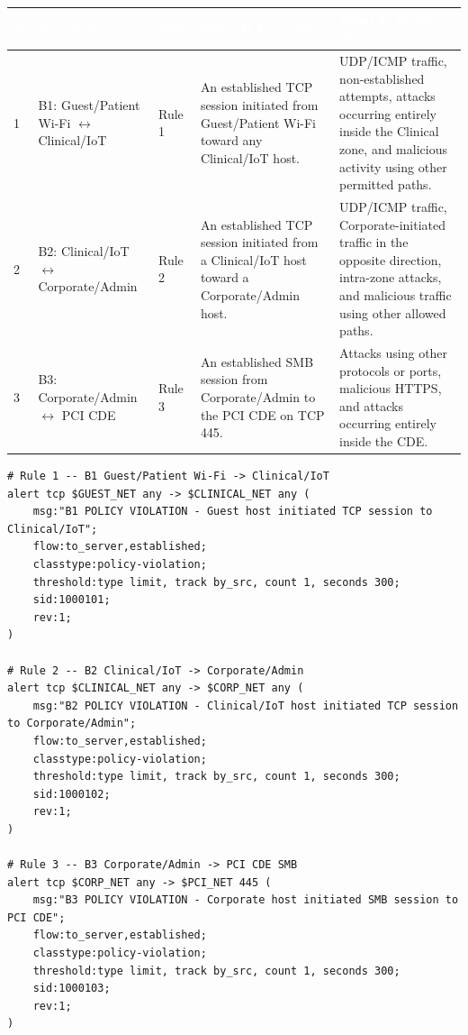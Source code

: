 \documentclass[11pt,letterpaper]{article}
\renewcommand{\arraystretch}{1.22}
\newcommand{\labtablesetup}{%
  \footnotesize
  \setlength{\tabcolsep}{4pt}%
  \renewcommand{\arraystretch}{1.28}%
}
\begin{document}
\begingroup\labtablesetup
{}
\begin{tabularx}{\textwidth}{@{}L{0.5cm}L{2.8cm}L{1.4cm}Y Y@{}}
\toprule
{}
\textcolor{white}{\textbf{\#}} &
\textcolor{white}{\textbf{Boundary}} &
\textcolor{white}{\textbf{Rule}} &
\textcolor{white}{\textbf{What It Fires On}} &
\textcolor{white}{\textbf{What It Would Miss}} \\
 &
B1: Guest/Patient Wi-Fi $\leftrightarrow$ Clinical/IoT &
Rule 1 &
An established TCP session initiated from Guest/Patient Wi-Fi toward any Clinical/IoT host. &
UDP/ICMP traffic, non-established attempts, attacks occurring entirely inside the Clinical zone, and malicious activity using other permitted paths. \\
2 &
B2: Clinical/IoT $\leftrightarrow$ Corporate/Admin &
Rule 2 &
An established TCP session initiated from a Clinical/IoT host toward a Corporate/Admin host. &
UDP/ICMP traffic, Corporate-initiated traffic in the opposite direction, intra-zone attacks, and malicious traffic using other allowed paths. \\
3 &
B3: Corporate/Admin $\leftrightarrow$ PCI CDE &
Rule 3 &
An established SMB session from Corporate/Admin to the PCI CDE on TCP 445. &
Attacks using other protocols or ports, malicious HTTPS, and attacks occurring entirely inside the CDE. \\
\bottomrule
\end{tabularx}
\endgroup

\begin{lstlisting}[caption={Suricata/Snort signature rules for B1, B2, and B3},label={lst:rules}]
# Rule 1 -- B1 Guest/Patient Wi-Fi -> Clinical/IoT
alert tcp $GUEST_NET any -> $CLINICAL_NET any (
    msg:"B1 POLICY VIOLATION - Guest host initiated TCP session to Clinical/IoT";
    flow:to_server,established;
    classtype:policy-violation;
    threshold:type limit, track by_src, count 1, seconds 300;
    sid:1000101;
    rev:1;
)

# Rule 2 -- B2 Clinical/IoT -> Corporate/Admin
alert tcp $CLINICAL_NET any -> $CORP_NET any (
    msg:"B2 POLICY VIOLATION - Clinical/IoT host initiated TCP session to Corporate/Admin";
    flow:to_server,established;
    classtype:policy-violation;
    threshold:type limit, track by_src, count 1, seconds 300;
    sid:1000102;
    rev:1;
)

# Rule 3 -- B3 Corporate/Admin -> PCI CDE SMB
alert tcp $CORP_NET any -> $PCI_NET 445 (
    msg:"B3 POLICY VIOLATION - Corporate host initiated SMB session to PCI CDE";
    flow:to_server,established;
    classtype:policy-violation;
    threshold:type limit, track by_src, count 1, seconds 300;
    sid:1000103;
    rev:1;
)
\end{lstlisting}
\end{document}
